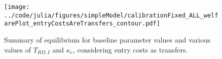 \documentclass[11pt,english]{article}
\theoremstyle{definition}
\begin{document}
\begin{figure}[]
	\centering
	\texttt{[image: ../code/julia/figures/simpleModel/calibrationFixed\_ALL\_welfarePlot\_entryCostsAreTransfers\_contour.pdf]}
	\caption{Summary of equilibrium for baseline parameter values and various values of $T_{RD,I}$ and $\kappa_c$, considering entry costs as transfers.}
	\label{calibration_ALL_welfarePlot_entryCostsAreTransfers}
\end{figure}



\newpage{} 
\printbibliography
\end{document}

